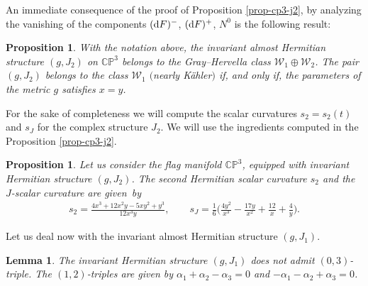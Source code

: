 \documentclass[10pt,a4paper]{amsart}
\numberwithin{equation}{section}
\newtheorem{Lemma}[Theorem]{Lemma}
\newtheorem{Proposition}[Theorem]{Proposition}
 { \theoremstyle{definition}
\newtheorem{Definition}[Theorem]{Definition}
\newtheorem{Question}[Theorem]{Question}
\newtheorem*{Notation}{Notation}
\newtheorem{Example}[Theorem]{Example}
\newtheorem{Remark}[Theorem]{Remark} }
\begin{document}
An immediate consequence of the proof of Proposition \ref{prop-cp3-j2}, by analyzing the vanishing of the components $({\rm d}F)^{-}$, $({\rm d}F)^{+}$, $N^0$ is the following result:
\begin{Proposition}
With the notation above, the invariant almost Hermitian structure $(g, J_{2})$ on $\mathbb{CP}^3$ belongs to the Gray--Hervella class $\mathcal{W}_{1}\oplus \mathcal{W}_{2}$. The pair $(g, J_{2})$ belongs to the class $\mathcal{W}_{1}$ $($nearly K\"ahler$)$ if, and only if, the parameters of the metric $g$ satisfies $x=y$.
\end{Proposition}

For the sake of completeness we will compute the scalar curvatures $s_2=s_{2}(t)$ and $s_J$ for the complex structure $J_2$. We will use the ingredients computed in the Proposition \ref{prop-cp3-j2}.

\begin{Proposition}
Let us consider the flag manifold $\mathbb{CP}^3$, equipped with invariant Hermitian structure $(g, J_{2})$. The second Hermitian scalar curvature $s_2$ and the $J$-scalar curvature are given~by
\begin{gather*}
s_{2}=\frac{4 x^3+12 x^2 y-5 x y^2+y^3}{12 x^3 y},
\qquad
s_{J}=\frac{1}{6} \bigg(\frac{4 y^2}{x^3}-\frac{17 y}{x^2}+\frac{12}{x}+\frac{4}{y}\bigg).
\end{gather*}
\end{Proposition}

Let us deal now with the invariant almost Hermitian structure $(g, J_{1})$.

\begin{Lemma}
The invariant Hermitian structure $(g, J_{1})$ does not admit $(0,3)$-triple. The $(1,2)$-triples are given by $\alpha_{1}+\alpha_{2}-\alpha_{3}=0$ and $-\alpha_{1}-\alpha_{2}+\alpha_{3}=0$.
\end{Lemma}
\end{document}
